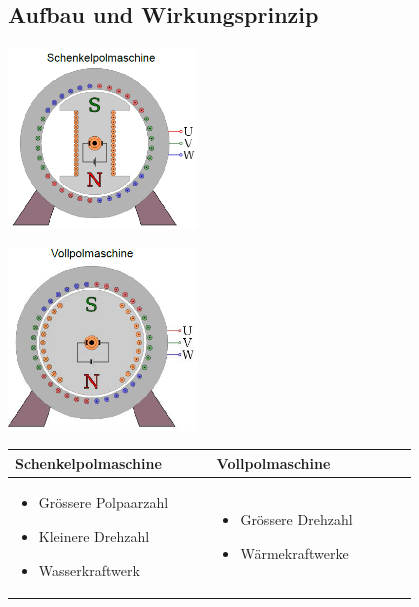 \subsection{Aufbau und Wirkungsprinzip}
    \begin{minipage}[b]{0.5\linewidth}
    	\includegraphics[width = 5cm]{images/Schenkelpolmaschine}
    \end{minipage}
    \begin{minipage}[b]{0.5\linewidth}
    	\includegraphics[width = 5cm]{images/Vollpolmaschine}
    \end{minipage}
    \begin{tabular}[b]{| C{0.4\linewidth} | C{0.4\linewidth} |}
    	\hline
    	\textbf{Schenkelpolmaschine} &
        \textbf{Vollpolmaschine}
        \\ \hline
        
    	\vspace{-0.7cm}
    	\begin{itemize}
    		\item Grössere Polpaarzahl
    		\item Kleinere Drehzahl
    		\item Wasserkraftwerk
    	\end{itemize} &
        \vspace{-0.7cm}
        \begin{itemize}
        	\item Grössere Drehzahl
        	\item Wärmekraftwerke
        \end{itemize}
        \\ \hline
    \end{tabular}
    \\
    \clearpage
    \pagebreak


